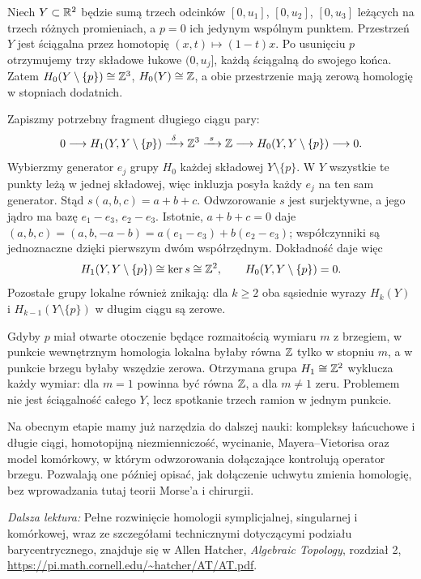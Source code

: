 \begin{przyklad}
\label{prz:lokalna-homologia-trojnog-8}
Niech $Y\subset\mathbb{R}^2$ będzie sumą trzech odcinków
$[0,u_1]$, $[0,u_2]$, $[0,u_3]$ leżących na trzech różnych
promieniach, a $p=0$ ich jedynym wspólnym punktem.
Przestrzeń $Y$ jest ściągalna przez homotopię
$(x,t)\mapsto(1-t)x$. Po usunięciu $p$ otrzymujemy trzy
składowe łukowe $(0,u_j]$, każdą ściągalną do swojego końca.
Zatem $H_0(Y\setminus\{p\})\cong\mathbb{Z}^3$, $H_0(Y)\cong\mathbb{Z}$,
a obie przestrzenie mają zerową homologię w stopniach dodatnich.

Zapiszmy potrzebny fragment długiego ciągu pary:
\[
 0\longrightarrow H_1(Y,Y\setminus\{p\})
 \xrightarrow{\ \delta\ }\mathbb{Z}^3
 \xrightarrow{\ s\ }\mathbb{Z}
 \longrightarrow H_0(Y,Y\setminus\{p\})
 \longrightarrow0.
\]
Wybierzmy generator $e_j$ grupy $H_0$ każdej składowej
$Y\setminus\{p\}$. W $Y$ wszystkie te punkty leżą w jednej
składowej, więc inkluzja posyła każdy $e_j$ na ten sam generator.
Stąd $s(a,b,c)=a+b+c$. Odwzorowanie $s$ jest surjektywne,
a jego jądro ma bazę $e_1-e_3$, $e_2-e_3$.
Istotnie, $a+b+c=0$ daje
$(a,b,c)=(a,b,-a-b)=a(e_1-e_3)+b(e_2-e_3)$;
współczynniki są jednoznaczne dzięki pierwszym dwóm współrzędnym.
Dokładność daje więc
\[
 H_1(Y,Y\setminus\{p\})\cong\ker s\cong\mathbb{Z}^2,
 \qquad H_0(Y,Y\setminus\{p\})=0.
\]
Pozostałe grupy lokalne również znikają: dla $k\geq2$
oba sąsiednie wyrazy $H_k(Y)$ i $H_{k-1}(Y\setminus\{p\})$
w długim ciągu są zerowe.

Gdyby $p$ miał otwarte otoczenie będące rozmaitością wymiaru $m$
z brzegiem, w punkcie wewnętrznym homologia lokalna byłaby równa
$\mathbb{Z}$ tylko w stopniu $m$, a w punkcie brzegu byłaby wszędzie zerowa.
Otrzymana grupa $H_1\cong\mathbb{Z}^2$ wyklucza każdy wymiar:
dla $m=1$ powinna być równa $\mathbb{Z}$, a dla $m\ne1$ zeru.
Problemem nie jest ściągalność
całego $Y$, lecz spotkanie trzech ramion w jednym punkcie.
\end{przyklad}



Na obecnym etapie mamy
już narzędzia do dalszej nauki:
kompleksy łańcuchowe i długie ciągi,
homotopijną niezmienniczość,
wycinanie, Mayera--Vietorisa
oraz model komórkowy, w którym
odwzorowania dołączające kontrolują
operator brzegu. Pozwalają one
później opisać, jak dołączenie
uchwytu zmienia homologię,
bez wprowadzania tutaj
teorii Morse'a i chirurgii.


\par\smallskip
{\footnotesize\noindent\emph{Dalsza lektura:}
Pełne rozwinięcie homologii symplicjalnej,
singularnej i komórkowej, wraz ze
szczegółami technicznymi dotyczącymi
podziału barycentrycznego, znajduje się
w Allen Hatcher,
\emph{Algebraic Topology}, rozdział 2,
\url{https://pi.math.cornell.edu/~hatcher/AT/AT.pdf}.\par}
\clearpage

